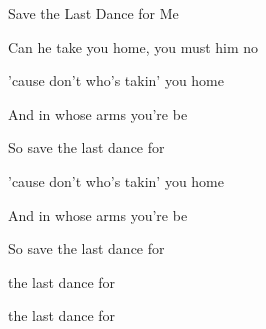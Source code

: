 \begin{SBSong}{Save the Last Dance for Me}
\begin{SBVerse}
    Can he take you home, you must  him no
    
    'cause don't  who's takin' you home
    
    And in whose arms you're  be
    
    So  save the last dance for 
  \end{SBVerse}
  \begin{SBVerse}
    'cause don't  who's takin' you home
    
    And in whose arms you're  be
    
    So  save the last dance for 
    
     the last dance for 
    
     the last dance for 
  \end{SBVerse}
\end{SBSong}
